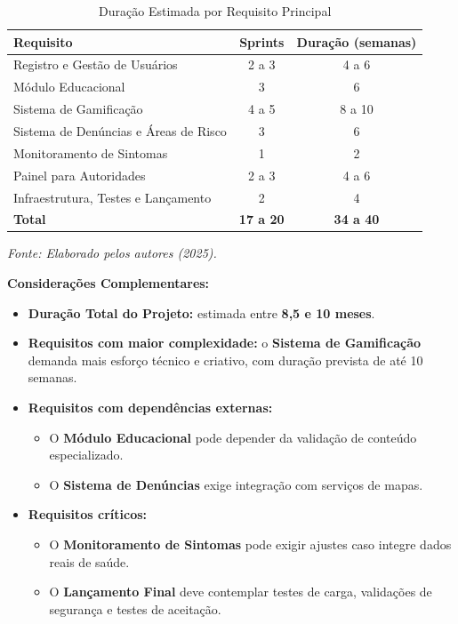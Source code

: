 \documentclass[a4paper, 12pt]{article}
\begin{document}
\begin{table}[H]
\centering
\caption{Duração Estimada por Requisito Principal}
\label{tab:cronograma}
\begin{tabular}{|l|c|c|}
\hline
\textbf{Requisito} & \textbf{Sprints} & \textbf{Duração (semanas)} \\
\hline
Registro e Gestão de Usuários & 2 a 3 & 4 a 6 \\
Módulo Educacional & 3  & 6 \\
Sistema de Gamificação & 4 a 5  & 8 a 10 \\
Sistema de Denúncias e Áreas de Risco & 3  & 6  \\
Monitoramento de Sintomas & 1  & 2  \\
Painel para Autoridades & 2 a 3  & 4 a 6  \\
Infraestrutura, Testes e Lançamento & 2  & 4 \\
\hline
\textbf{Total} & \textbf{17 a 20} & \textbf{34 a 40} \\
\hline
\end{tabular}
\smallskip

\raggedright
\textit{Fonte: Elaborado pelos autores (2025).}
\end{table}

\noindent \textbf{Considerações Complementares:}
\begin{itemize}
    \item \textbf{Duração Total do Projeto:} estimada entre \textbf{8,5 e 10 meses}.
    \item \textbf{Requisitos com maior complexidade:} o \textbf{Sistema de Gamificação} demanda mais esforço técnico e criativo, com duração prevista de até 10 semanas.
    \item \textbf{Requisitos com dependências externas:}
    \begin{itemize}
        \item O \textbf{Módulo Educacional} pode depender da validação de conteúdo especializado.
        \item O \textbf{Sistema de Denúncias} exige integração com serviços de mapas.
    \end{itemize}
    \item \textbf{Requisitos críticos:}
    \begin{itemize}
        \item O \textbf{Monitoramento de Sintomas} pode exigir ajustes caso integre dados reais de saúde.
        \item O \textbf{Lançamento Final} deve contemplar testes de carga, validações de segurança e testes de aceitação.
    \end{itemize}
\end{itemize}
\end{document}
